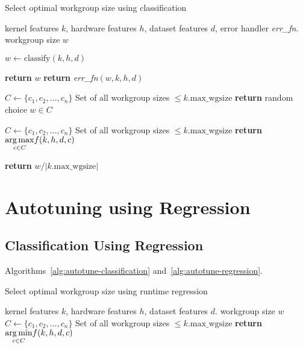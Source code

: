 \begin{algorithm}
\caption{Select optimal workgroup size using classification}
\label{alg:autotune-classification}
\begin{algorithmic}[1]
\Require kernel features $k$, hardware features $h$, dataset features
$d$, error handler \textit{err\_fn}.
\Ensure workgroup size $w$

\State $w \leftarrow \text{classify}(k, h, d)$

    \State \textbf{return} $w$
\Else
    \State \textbf{return} \textit{err\_fn}$(w, k, h, d)$
\EndIf
\item[]

  \State $C \leftarrow \{c_1, c_2, \ldots, c_n \}$
  \Comment Set of all workgroup sizes $\le k.\text{max\_wgsize}$
  \State \textbf{return} random choice $w \in C$
\EndProcedure
\item[]

  \State $C \leftarrow \{c_1, c_2, \ldots, c_n \}$
  \Comment Set of all workgroup sizes $\le k.\text{max\_wgsize}$
  \State \textbf{return} $\underset{c \in C}{\operatorname*{arg\,max}} f(k,h,d,c)$
\EndProcedure
\item[]

  \State \textbf{return} $w / |k.\text{max\_wgsize}|$
\EndProcedure
\end{algorithmic}
\end{algorithm}


\section{Autotuning using Regression}


\subsection{Classification Using Regression}

Algorithms~\ref{alg:autotune-classification} and~\ref{alg:autotune-regression}.

\begin{algorithm}
\caption{Select optimal workgroup size using runtime regression}
\label{alg:autotune-classification}
\begin{algorithmic}[1]
\Require kernel features $k$, hardware features $h$, dataset features
$d$.
\Ensure workgroup size $w$
\State $C \leftarrow \{c_1, c_2, \ldots, c_n \}$
\Comment Set of all workgroup sizes $\le k.\text{max\_wgsize}$
\State \textbf{return} $\underset{c \in C}{\operatorname*{arg\,min}} f(k,h,d,c)$
\end{algorithmic}
\end{algorithm}

